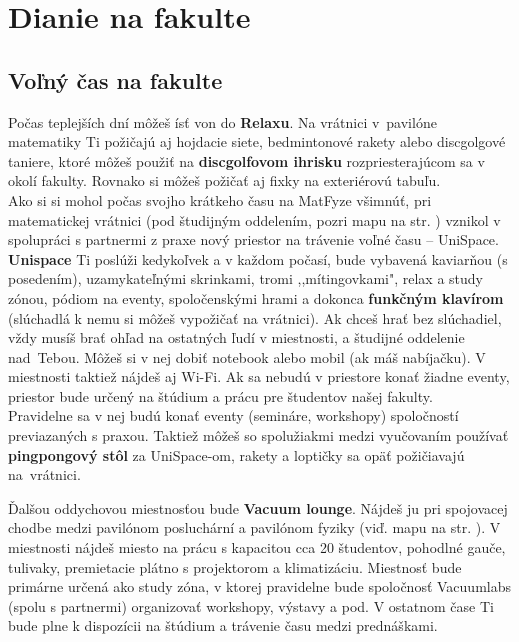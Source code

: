 \chapter{Dianie na fakulte}

\section{Voľný čas na fakulte}

Počas teplejších dní môžeš ísť von do \textbf{Relaxu}. Na vrátnici
v~pavilóne matematiky Ti požičajú aj hojdacie siete, bedmintonové
rakety alebo discgolgové taniere, ktoré môžeš použiť na
\textbf{discgolfovom ihrisku} rozpriesterajúcom sa v okolí fakulty. Rovnako si môžeš požičať aj fixky na exteriérovú tabuľu.\\


Ako si si mohol počas svojho krátkeho času na MatFyze všimnúť, pri matematickej vrátnici (pod študijným oddelením, pozri mapu na str. \pageref{fig:mapa_fmfi}) vznikol v spolupráci s partnermi z praxe nový priestor na trávenie voľné času – UniSpace.\\

\textbf{Unispace} Ti poslúži kedykoľvek a v každom počasí, bude vybavená kaviarňou (s posedením), uzamykateľnými skrinkami, tromi ,,mítingovkami", relax a study zónou, pódiom na eventy, spoločenskými hrami a dokonca \textbf{funkčným klavírom} (slúchadlá k nemu si môžeš vypožičať na vrátnici). Ak chceš hrať bez slúchadiel, vždy musíš brať ohľad na ostatných ľudí v miestnosti, a študijné oddelenie nad~Tebou. Môžeš si v nej dobiť notebook alebo mobil (ak máš nabíjačku). V miestnosti taktiež nájdeš aj Wi-Fi. Ak sa nebudú v priestore konať žiadne eventy, priestor bude určený na štúdium a prácu pre študentov našej fakulty. \\

Pravidelne sa v nej budú konať eventy (semináre, workshopy) spoločností previazaných s praxou. Taktiež môžeš so spolužiakmi medzi vyučovaním používať \textbf{pingpongový stôl} za UniSpace-om, rakety a loptičky sa opäť požičiavajú na~vrátnici.

Ďalšou oddychovou miestnosťou bude \textbf{Vacuum lounge}. Nájdeš ju pri spojovacej chodbe medzi pavilónom posluchární a pavilónom fyziky (viď. mapu na str. \pageref{fig:mapa_fmfi}). V miestnosti nájdeš miesto na prácu s kapacitou cca 20 študentov, pohodlné gauče, tulivaky,  premietacie plátno s projektorom a klimatizáciu. Miestnosť bude primárne určená ako study zóna, v ktorej pravidelne bude spoločnosť Vacuumlabs (spolu s partnermi) organizovať workshopy, výstavy a pod. V ostatnom čase Ti bude plne k dispozícii na štúdium a trávenie času medzi prednáškami.\\

